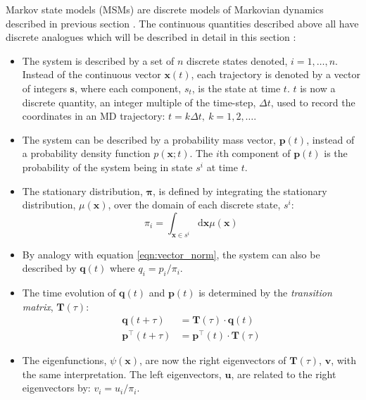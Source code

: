 Markov state models (MSMs) are discrete models of Markovian dynamics described in previous section \cite{prinzMarkovModelsMolecular2011}. The continuous quantities described above all have discrete analogues which will be described in detail in this section \cite{prinzMarkovModelsMolecular2011}:
\begin{itemize}
    \item The system is described by a set of $n$ discrete states denoted, $i=1, \ldots, n$. Instead of the continuous vector $\mathbf{x}(t)$, each trajectory is denoted by a vector of integers $\mathbf{s}$, where each component, $s_t$, is the state at time $t$. $t$ is now a discrete quantity, an integer multiple of the time-step, $\Delta t$, used to record the coordinates in an MD trajectory: $t=k\Delta t,\ k=1, 2, \ldots$. 
    \item The system can be described by a probability mass vector, $\mathbf{p}(t)$,  instead of a probability density function $p(\mathbf{x};t)$. The $i$th component of $\mathbf{p}(t)$ is the probability of the system being in  state $s^{i}$ at time $t$.
    \item The stationary distribution, $\bm{\pi}$, is defined by integrating the stationary distribution, $\mu(\mathbf{x})$, over the domain of each discrete state, $s^{i}$:
        \begin{equation*}
            \pi_{i}=\int_{\mathbf{x} \in s^{i}} \mathrm{d}\mathbf{x}\mu(\mathbf{x})
        \end{equation*}
    \item By analogy with equation \ref{eqn:vector_norm}, the system can also be described by $\mathbf{q}(t)$ where $q_{i} = p_{i}/\pi_{i}$.
    \item The time evolution of $\mathbf{q}(t)$ and $\mathbf{p}(t)$ is determined by the \emph{transition matrix}, $\mathbf{T}(\tau)$:
        \begin{align*}
            \mathbf{q}(t+\tau) &= \mathbf{T}(\tau) \cdot \mathbf{q}(t) \\
            \mathbf{p}^{\top}(t+\tau) & = \mathbf{p}^{\top}(t)\cdot \mathbf{T}(\tau)
        \end{align*}
    \item The eigenfunctions, $\psi(\mathbf{x})$, are now the right eigenvectors of $\mathbf{T}(\tau)$, $\mathbf{v}$, with the same interpretation. The left eigenvectors, $\mathbf{u}$, are related to the right eigenvectors by: $v_{i} = u_{i}/\pi_{i}$.  
 \end{itemize}

